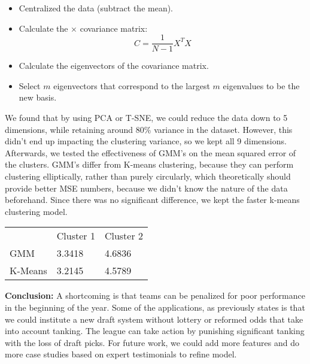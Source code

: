 \documentclass{article}
\begin{document}
\begin{itemize}
	\item Centralized the data (subtract the mean). 
	\item Calculate the × covariance matrix:
    \[C=\frac{1}{N-1}X^{T}X\]
	\item Calculate the eigenvectors of the covariance matrix.
    \item Select $m$ eigenvectors that correspond to the largest $m$ eigenvalues to be the new basis.
\end{itemize}

We found that by using PCA or T-SNE, we could reduce the data down to 5 dimensions, while retaining around 80\% variance in the dataset. However, this didn't end up impacting the clustering variance, so we kept all 9 dimensions. Afterwards, we tested the effectiveness of GMM's on the mean squared error of the clusters. GMM's differ from K-means clustering, because they can perform clustering elliptically, rather than purely circularly, which theoretically should provide better MSE numbers, because we didn't know the nature of the data beforehand. Since there was no significant difference, we kept the faster k-means clustering model.

\begin{table}[]
\centering
    \begin{tabular}{lll}
            & Cluster 1 & Cluster 2 \\
    GMM     & 3.3418    & 4.6836    \\
    K-Means & 3.2145    & 4.5789   
    \end{tabular}
\end{table}


\textbf{Conclusion:} A shortcoming is that teams can be penalized for poor performance in the beginning of the year. Some of the applications, as previously states is that we could institute a new draft system without lottery or reformed odds that take into account tanking. The league can take action by punishing significant tanking with the loss of draft picks. For future work, we could add more features and do more case studies based on expert testimonials to refine model.
\end{document}
